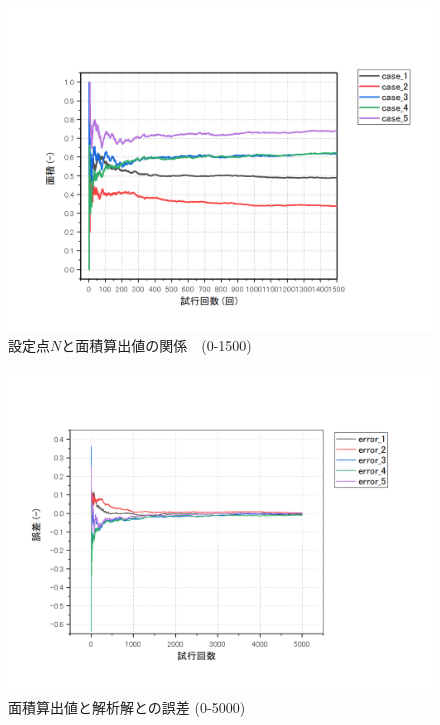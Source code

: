 \documentclass[12pt,a4paper]{jsarticle}
\begin{document}
\begin{figure}[htbp]
    \begin{center}
        \includegraphics[width=150mm]{result_0-1500.png}
        \caption{設定点$N$と面積算出値の関係　(0-1500)}
    \end{center}
\end{figure}
\begin{figure}[htbp]
    \begin{center}
        \includegraphics[width=150mm]{error_0-5000.png}
        \caption{面積算出値と解析解との誤差 (0-5000)}
    \end{center}
\end{figure}
\end{document}

